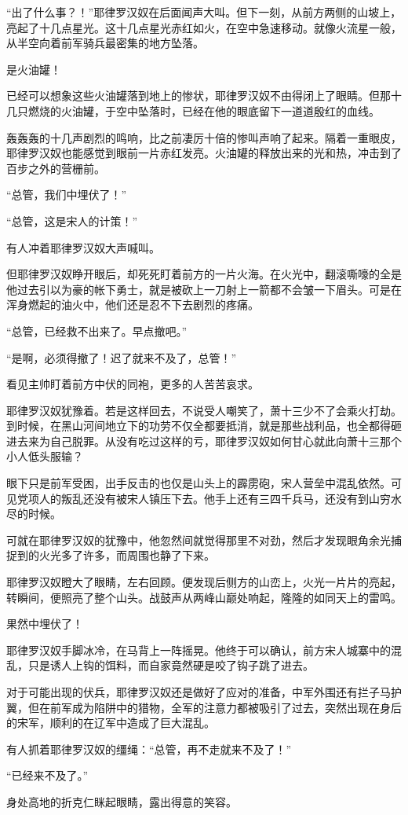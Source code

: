 “出了什么事？！”耶律罗汉奴在后面闻声大叫。但下一刻，从前方两侧的山坡上，亮起了十几点星光。这十几点星光赤红如火，在空中急速移动。就像火流星一般，从半空向着前军骑兵最密集的地方坠落。

是火油罐！

已经可以想象这些火油罐落到地上的惨状，耶律罗汉奴不由得闭上了眼睛。但那十几只燃烧的火油罐，于空中坠落时，已经在他的眼底留下一道道殷红的血线。

轰轰轰的十几声剧烈的鸣响，比之前凄厉十倍的惨叫声响了起来。隔着一重眼皮，耶律罗汉奴也能感觉到眼前一片赤红发亮。火油罐的释放出来的光和热，冲击到了百步之外的营栅前。

“总管，我们中埋伏了！”

“总管，这是宋人的计策！”

有人冲着耶律罗汉奴大声喊叫。

但耶律罗汉奴睁开眼后，却死死盯着前方的一片火海。在火光中，翻滚嘶嚎的全是他过去引以为豪的帐下勇士，就是被砍上一刀射上一箭都不会皱一下眉头。可是在浑身燃起的油火中，他们还是忍不下去剧烈的疼痛。

“总管，已经救不出来了。早点撤吧。”

“是啊，必须得撤了！迟了就来不及了，总管！”

看见主帅盯着前方中伏的同袍，更多的人苦苦哀求。

耶律罗汉奴犹豫着。若是这样回去，不说受人嘲笑了，萧十三少不了会乘火打劫。到时候，在黑山河间地立下的功劳不仅全都要抵消，就是那些战利品，也全都得砸进去来为自己脱罪。从没有吃过这样的亏，耶律罗汉奴如何甘心就此向萧十三那个小人低头服输？

眼下只是前军受困，出手反击的也仅是山头上的霹雳砲，宋人营垒中混乱依然。可见党项人的叛乱还没有被宋人镇压下去。他手上还有三四千兵马，还没有到山穷水尽的时候。

可就在耶律罗汉奴的犹豫中，他忽然间就觉得那里不对劲，然后才发现眼角余光捕捉到的火光多了许多，而周围也静了下来。

耶律罗汉奴瞪大了眼睛，左右回顾。便发现后侧方的山峦上，火光一片片的亮起，转瞬间，便照亮了整个山头。战鼓声从两峰山巅处响起，隆隆的如同天上的雷鸣。

果然中埋伏了！

耶律罗汉奴手脚冰冷，在马背上一阵摇晃。他终于可以确认，前方宋人城寨中的混乱，只是诱人上钩的饵料，而自家竟然硬是咬了钩子跳了进去。

对于可能出现的伏兵，耶律罗汉奴还是做好了应对的准备，中军外围还有拦子马护翼，但在前军成为陷阱中的猎物，全军的注意力都被吸引了过去，突然出现在身后的宋军，顺利的在辽军中造成了巨大混乱。

有人抓着耶律罗汉奴的缰绳：“总管，再不走就来不及了！”

“已经来不及了。”

身处高地的折克仁眯起眼睛，露出得意的笑容。

